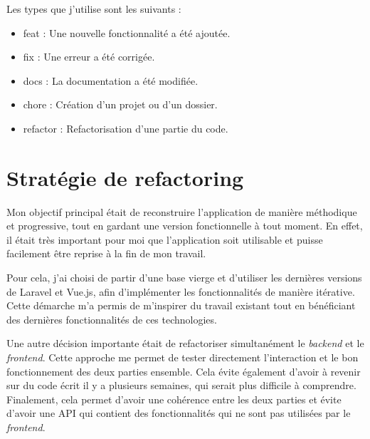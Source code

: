 Les types que j'utilise sont les suivants :
\begin{itemize}
    \item feat : Une nouvelle fonctionnalité a été ajoutée.
    \item fix : Une erreur a été corrigée.
    \item docs : La documentation a été modifiée.
    \item chore : Création d'un projet ou d'un dossier.
    \item refactor : Refactorisation d'une partie du code.
\end{itemize}

\section{Stratégie de refactoring}

Mon objectif principal était de reconstruire l'application de manière méthodique et progressive, tout en gardant une version fonctionnelle à tout moment. En effet, il était très important pour moi que l'application soit utilisable et puisse facilement être reprise à la fin de mon travail.

Pour cela, j'ai choisi de partir d'une base vierge et d'utiliser les dernières versions de Laravel et Vue.js, afin d'implémenter les fonctionnalités de manière itérative. Cette démarche m'a permis de m'inspirer du travail existant tout en bénéficiant des dernières fonctionnalités de ces technologies.

Une autre décision importante était de refactoriser simultanément le \emph{backend} et le \emph{frontend}. Cette approche me permet de tester directement l'interaction et le bon fonctionnement des deux parties ensemble. Cela évite également d'avoir à revenir sur du code écrit il y a plusieurs semaines, qui serait plus difficile à comprendre. Finalement, cela permet d'avoir une cohérence entre les deux parties et évite d'avoir une API qui contient des fonctionnalités qui ne sont pas utilisées par le \emph{frontend}.

